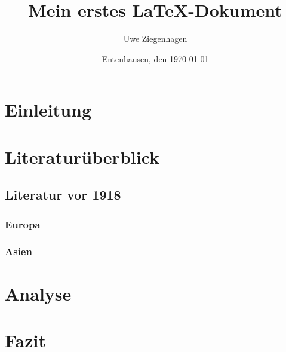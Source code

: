 \documentclass[12pt,ngerman]{scrartcl}
\author{Uwe Ziegenhagen}
\title{Mein erstes LaTeX-Dokument}
\date{Entenhausen, den \today}
\begin{document}
\maketitle

\tableofcontents

\section{Einleitung}

\blindtext

\section{Literaturüberblick}
\subsection{Literatur vor 1918}
\subsubsection{Europa}

\blindtext[30]

\subsubsection{Asien}

\blindtext[20]


\section{Analyse}

\blindtext[10]

\section{Fazit}

\blindtext[10]
\end{document}
